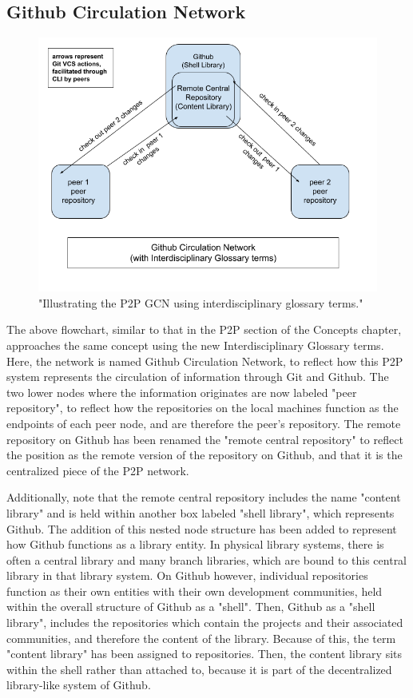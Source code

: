 \subsection{Github Circulation Network}

\begin{figure}[hbt!]
\begin{center}
\includegraphics[width=.8\textwidth]{./images/gcn_flowchart.png}
\caption{"Illustrating the P2P GCN using interdisciplinary glossary terms."}
\vspace{0in}
\end{center}
\end{figure}

The above flowchart, similar to that in the P2P section of the Concepts chapter, approaches the same concept using the new Interdisciplinary Glossary terms. Here, the network is named Github Circulation Network, to reflect how this P2P system represents the circulation of information through Git and Github. The two lower nodes where the information originates are now labeled "peer repository", to reflect how the repositories on the local machines function as the endpoints of each peer node, and are therefore the peer's repository. The remote repository on Github has been renamed the "remote central repository" to reflect the position as the remote version of the repository on Github, and that it is the centralized piece of the P2P network. 

Additionally, note that the remote central repository includes the name "content library" and is held within another box labeled "shell library", which represents Github. The addition of this nested node structure has been added to represent how Github functions as a library entity. In physical library systems, there is often a central library and many branch libraries, which are bound to this central library in that library system. On Github however, individual repositories function as their own entities with their own development communities, held within the overall structure of Github as a "shell". Then, Github as a "shell library", includes the repositories which contain the projects and their associated communities, and therefore the content of the library. Because of this, the term "content library" has been assigned to repositories. Then, the content library sits within the shell rather than attached to, because it is part of the decentralized library-like system of Github.  

